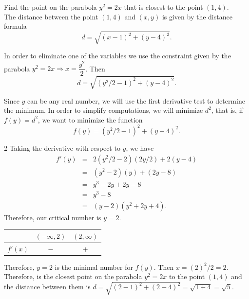 \documentclass{book}
\begin{document}
\begin{Exam} Find the point on the parabola $y^2=2x$ that is closest to the point $(1,4)$.\\

The distance between the point $(1,4)$  and $(x,y)$ is given by the distance formula
\[d = \sqrt{(x-1)^2 + (y-4)^2}.\]

In order to eliminate one of the variables we use the constraint given by the parabola $y^2=2x \Rightarrow x = \dfrac{y^2}{2}$. Then 
\[d = \sqrt{(y^2/2-1)^2 + (y-4)^2}.\]

Since $y$ can be any real number, we will use the first derivative test to determine the minimum. In order to simplify computations, we will minimize $d^2$, that is, if $f(y) = d^2$, we want to minimize the function 
\[f(y) = (y^2/2-1)^2 + (y-4)^2.\]

\begin{multicols}{2}
Taking the derivative with respect to $y$, we have 
\begin{eqnarray*}
f'(y) &=& 2(y^2/2-2)(2y/2) + 2(y-4)\\
&=& (y^2-2)(y) + (2y-8)\\
&=& y^3-2y + 2y-8\\
&=& y^3-8\\
&=& (y-2)(y^2+2y+4).
\end{eqnarray*}
Therefore, our critical number is $y=2$. 
\begin{center}
\begin{tabular}{c|c|c}

 & $(-\infty, 2)$ & $(2,\infty)$ \\ \hline
$f'(x)$ & $-$ & $+$ \\ 
\end{tabular}
\end{center}
Therefore, $y=2$ is the minimal number for $f(y)$. Then $x= (2)^2/2 = 2$. Therefore,  is the closest point on the parabola $y^2=2x$ to the point $(1,4)$ and the distance between them is $d = \sqrt{(2-1)^2+(2-4)^2} = \sqrt{1+4} = \sqrt{5}$. \\

\begin{center}
\end{center}
\end{multicols}
\end{Exam}\vs
\end{document}
